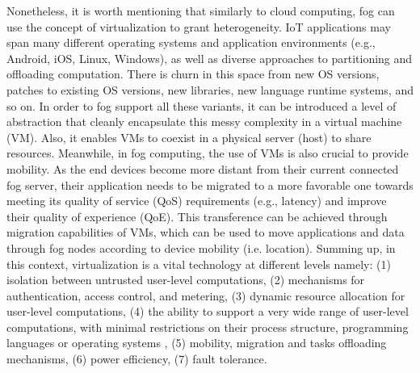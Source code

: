\noindent\tab Nonetheless, it is worth mentioning that similarly to cloud computing, fog can use the concept of virtualization to grant heterogeneity. IoT applications may span many different operating systems and application environments (e.g., Android, iOS, Linux, Windows), as well as diverse approaches to partitioning and offloading computation. There is churn in this space from new OS versions, patches to existing OS versions, new libraries, new language runtime systems, and so on. In order to fog support all these variants, it can be introduced a level of abstraction that cleanly encapsulate this messy complexity in a virtual machine (VM). Also, it enables VMs to coexist in a physical server (host) to share resources. Meanwhile, in fog computing, the use of VMs is also crucial to provide mobility. As the end devices become more distant from their current connected fog server, their application needs to be migrated to a more favorable one towards meeting its quality of service (QoS) requirements (e.g., latency) and improve their quality of experience (QoE). This transference can be achieved through migration capabilities of VMs, which can be used to move applications and data through fog nodes according to device mobility (i.e. location). Summing up, in this context, virtualization is a vital technology at different levels namely: (1) isolation between untrusted user-level computations, (2) mechanisms for authentication, access control, and metering, (3) dynamic resource allocation for user-level computations, (4) the ability to support a very wide range of user-level computations, with minimal restrictions on their process structure, programming languages or operating systems \cite{Cloudlet83:online}, (5) mobility, migration and tasks offloading mechanisms, (6) power efficiency, (7) fault tolerance.\\
